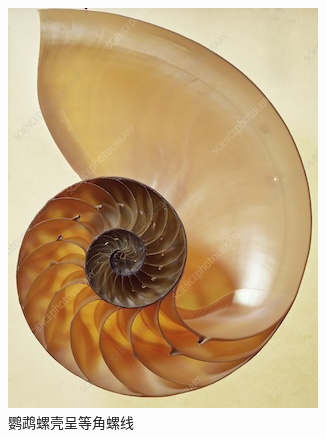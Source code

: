 \documentclass[b5paper]{ctexart}
\begin{document}
\begin{figure}[htbp]
 \centering
 \includegraphics[scale=0.4]{img/nautilus}
 \caption{鹦鹉螺壳呈等角螺线}
 \label{fig:nautilus}
\end{figure}
\end{document}
